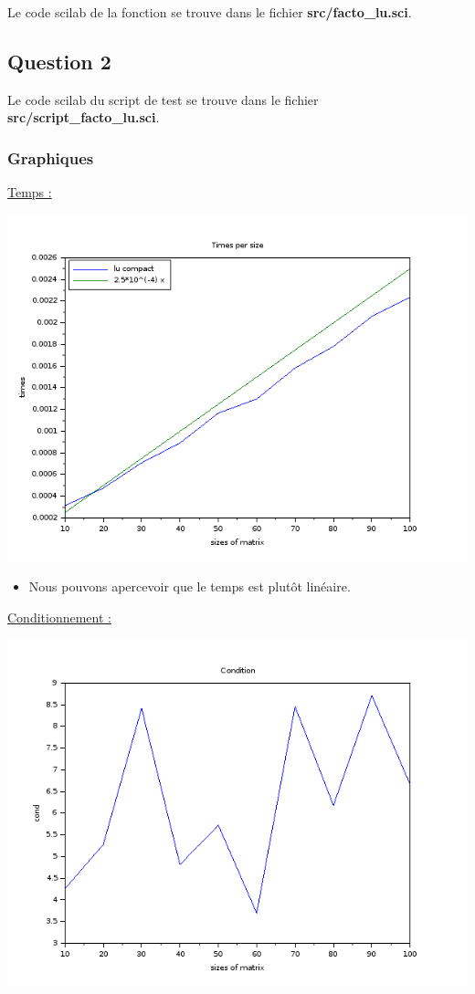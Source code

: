 \documentclass[11pt]{article}
\begin{document}
Le code scilab de la fonction se trouve dans le fichier
\textbf{src/facto\_lu.sci}.

\subsection{Question 2}

Le code scilab du script de test se trouve dans le fichier
\textbf{src/script\_facto\_lu.sci}.

\subsubsection{Graphiques}

\underline{Temps :}

\includegraphics[scale=0.5]{img/lu_times.png}

\begin{itemize}
\item Nous pouvons apercevoir que le temps est plutôt linéaire.
\end{itemize}

\underline{Conditionnement :}

\includegraphics[scale=0.5]{img/lu_cond.png}
\end{document}

